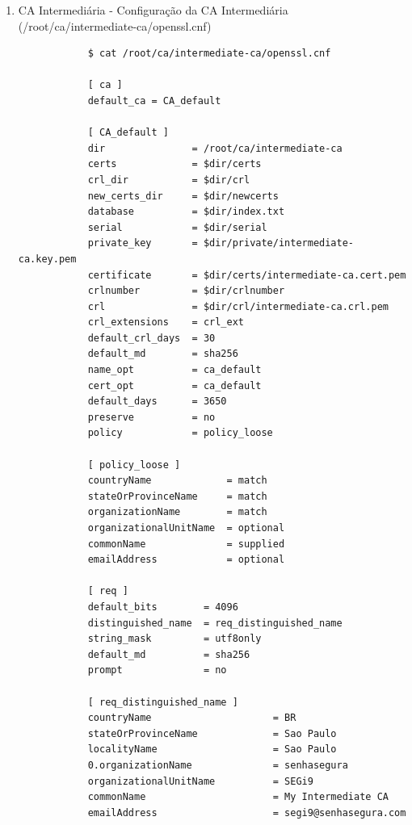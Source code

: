 \documentclass{article}
\begin{document}
\begin{enumerate}
\begin{tcolorbox}[width=\textwidth, enhanced, breakable]
{\begin{verbatim}
			[ v3_ca ]
			subjectKeyIdentifier = hash
			authorityKeyIdentifier = keyid:always,issuer
			basicConstraints = critical,CA:true
			keyUsage = critical, digitalSignature, cRLSign, keyCertSign
			
			[ v3_intermediate_ca ]
			subjectKeyIdentifier = hash
			authorityKeyIdentifier = keyid:always,issuer
			basicConstraints = critical,CA:true,pathlen:0
			keyUsage = critical, digitalSignature, cRLSign, keyCertSign
			
			[ crl_ext ]
			authorityKeyIdentifier=keyid:always
		\end{verbatim}
	}
	\end{tcolorbox}

	\item CA Intermediária - Configuração da CA Intermediária (/root/ca/intermediate-ca/openssl.cnf)
	\begin{tcolorbox}[width=\textwidth, enhanced, breakable]
	{\footnotesize
		\begin{verbatim}
			$ cat /root/ca/intermediate-ca/openssl.cnf

			[ ca ]
			default_ca = CA_default
			
			[ CA_default ]
			dir               = /root/ca/intermediate-ca
			certs             = $dir/certs
			crl_dir           = $dir/crl
			new_certs_dir     = $dir/newcerts
			database          = $dir/index.txt
			serial            = $dir/serial
			private_key       = $dir/private/intermediate-ca.key.pem
			certificate       = $dir/certs/intermediate-ca.cert.pem
			crlnumber         = $dir/crlnumber
			crl               = $dir/crl/intermediate-ca.crl.pem
			crl_extensions    = crl_ext
			default_crl_days  = 30
			default_md        = sha256
			name_opt          = ca_default
			cert_opt          = ca_default
			default_days      = 3650
			preserve          = no
			policy            = policy_loose
			
			[ policy_loose ]
			countryName             = match
			stateOrProvinceName     = match
			organizationName        = match
			organizationalUnitName  = optional
			commonName              = supplied
			emailAddress            = optional
			
			[ req ]
			default_bits        = 4096
			distinguished_name  = req_distinguished_name
			string_mask         = utf8only
			default_md          = sha256
			prompt              = no
			
			[ req_distinguished_name ]
			countryName                     = BR
			stateOrProvinceName             = Sao Paulo
			localityName                    = Sao Paulo
			0.organizationName              = senhasegura
			organizationalUnitName          = SEGi9
			commonName                      = My Intermediate CA
			emailAddress                    = segi9@senhasegura.com
			

\end{verbatim}}
\end{tcolorbox}
\end{enumerate}
\end{document}
